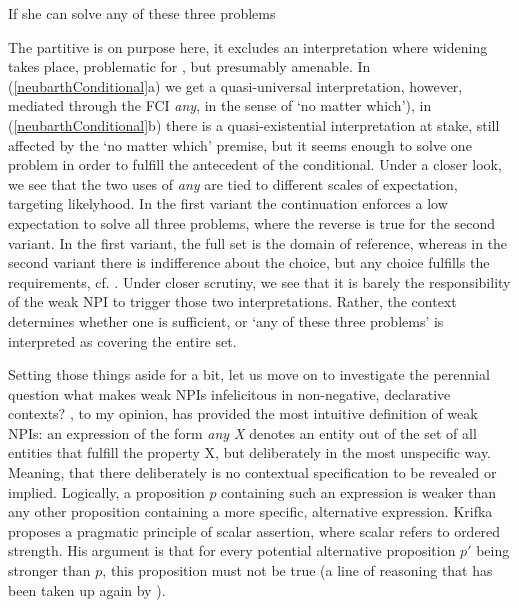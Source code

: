 \documentclass[output=paper,colorlinks,citecolor=brown,
]{langscibook}
\begin{document}
  \begin{exe}
    \ex\label{neubarthConditional} If she can solve any of these three problems
    \begin{xlist}
    \end{xlist}
  \end{exe}

The partitive is on purpose here, it excludes an interpretation where widening takes place, problematic for
\citet{kadmonlandmann1993}, but presumably amenable. In (\ref{neubarthConditional}a) we get a quasi-universal interpretation,
however, mediated through the FCI \textit{any}, in the sense of `no matter which'), in (\ref{neubarthConditional}b) there is a
quasi-existential interpretation at stake, still affected by the `no matter which' premise, but it seems enough to
solve one problem in order to fulfill the antecedent of the conditional. Under a closer look, we see that the two uses
of {\em any} are tied to different scales of expectation, targeting likelyhood. In the first variant the continuation
enforces a low expectation to solve all three problems, where the reverse is true for the second variant. In the first
variant, the full set is the domain of reference, whereas in the second variant there is indifference about the choice,
but any choice fulfills the requirements, cf. \citet{dayal2004}. Under closer scrutiny, we see that it is barely the
responsibility of the weak NPI to trigger those two interpretations. Rather, the context determines whether one is
sufficient, or `any of these three problems' is interpreted as covering the entire set.

Setting those things aside for a bit, let us move on to investigate the perennial question what makes weak NPIs infelicitous in
non-negative, declarative contexts? \citet{krifka1995}, to my opinion, has provided the most intuitive definition of weak NPIs:
an expression of the form {\em any X} denotes an entity out of the set of all entities that fulfill the property X, but
deliberately in the most unspecific way. Meaning, that there deliberately is no contextual specification to be revealed
or implied. Logically, a proposition $p$ containing such an expression is weaker than any other proposition containing
a more specific, alternative expression. Krifka proposes a pragmatic principle of scalar assertion, where scalar
refers to ordered strength. His argument is that for every potential alternative proposition $p'$ being stronger than
$p$, this proposition must not be true (a line of reasoning that has been taken up again by \citealt{chierchia2004}).
\end{document}
